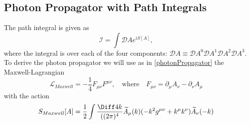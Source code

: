 \subsection{Photon Propagator with Path Integrals}
The path integral is given as
\begin{equation}
	\mathcal{I} = \int \mathcal{D} A e^{iS[A]},
\end{equation}
where the integral is over each of the four components: $\mathcal{D} A \equiv \mathcal{D}A^0  \mathcal{D}A^1  \mathcal{D}A^2  \mathcal{D}A^3$. To derive the photon propagator we will use as in \ref{photonPropagator} the Maxwell-Lagrangian
\begin{equation}
	\mathcal{L}_{Maxwell} = -\frac{1}{4} F_{\mu\nu}F^{\mu\nu}, \quad \text{where} \quad F_{\mu\nu} = \partial_\mu A_\nu - \partial_\nu A_\mu
\end{equation}
with the action
\begin{equation}
	S_{Maxwell} [A] = \frac{1}{2} \int \frac{\Diff4k}{((2\pi)^4} \widetilde{A}_\mu(k) (-k^2 g^{\mu\nu} + k^\mu k^\nu) \widetilde{A}_\nu(-k)
\end{equation}

